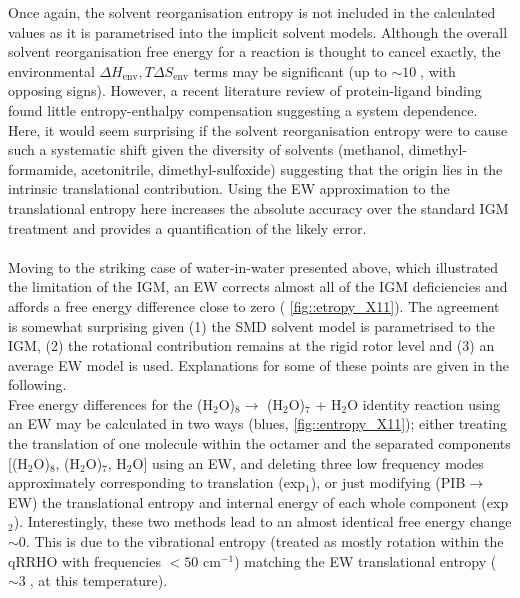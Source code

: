 \documentclass[../main.tex]{subfiles}
\begin{document}
Once again, the solvent reorganisation entropy is not included in the calculated values as it is parametrised into the implicit solvent models. Although the overall solvent reorganisation free energy for a reaction is thought to cancel exactly, the environmental $\Delta H_\text{env}, T\Delta S_\text{env}$ terms may be significant (up to $\sim 10\;$\kcal, with opposing signs).\cite{Grunwald1995}
However, a recent literature review of protein-ligand binding found little entropy-enthalpy compensation suggesting a system dependence.\cite{Chodera2013} Here, it would seem surprising if the solvent reorganisation entropy were to cause such a systematic shift given the diversity of solvents (methanol, dimethyl-formamide, acetonitrile, dimethyl-sulfoxide) suggesting that the origin lies in the intrinsic translational contribution. Using the EW approximation to the translational entropy here increases the absolute accuracy over the standard IGM treatment and provides a quantification of the likely error. 
\\\\
Moving to the striking case of water-in-water presented above, which illustrated the limitation of the IGM, an EW corrects almost all of the IGM deficiencies and affords a free energy difference close to zero (\figurename{ \ref{fig::etropy_X11}}). The agreement is somewhat surprising given (1) the SMD solvent model is parametrised to the IGM, (2) the rotational contribution remains at the rigid rotor level and (3) an average EW model is used. Explanations for some of these points are given in the following.
\\
Free energy differences for the (H$_2$O)$_8 \longrightarrow$ (H$_2$O)$_7$ +  H$_2$O identity reaction using an EW may be calculated in two ways (blues, \figurename{ \ref{fig::entropy_X11}}); either treating the translation of one molecule within the octamer and the separated components [(H$_2$O)$_8$, (H$_2$O)$_7$, H$_2$O] using an EW,  and deleting three low frequency modes approximately corresponding to translation (exp$_1$), or just modifying (PIB$\rightarrow$EW) the translational entropy and internal energy of each whole component  (exp$_2$). Interestingly, these two methods lead to an almost identical free energy change $\sim 0$. This is due to the vibrational entropy (treated as mostly rotation within the qRRHO with frequencies $< 50$ cm$^{-1}$) matching the EW translational entropy ($\sim 3\;$\kcal, at this temperature). 
\vspace{0.4cm}
\end{document}
